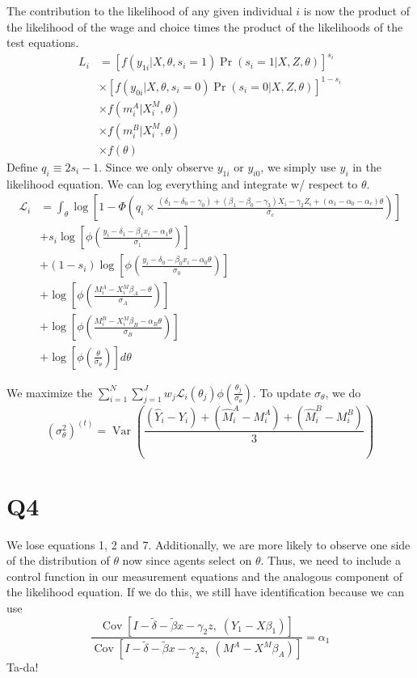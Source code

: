 \documentclass[11pt,letterpaper]{article}
\DeclareMathOperator{\Var}{Var}
\DeclareMathOperator{\Cov}{Cov}
\begin{document}
The contribution to the likelihood of any given individual $i$ is now the product of the likelihood of the wage and choice times the product of the likelihoods of the test equations.
\begin{align*}
L_i &= 
	         \left[f(y_{1i}|X,\theta,s_i=1)\Pr(s_i=1|X,Z,\theta)\right]^{s_i} \\
	& \times \left[f(y_{0i}|X,\theta,s_i=0)\Pr(s_i=0|X,Z,\theta)\right]^{1-s_i} \\
	& \times f(m^A_i|X_i^M,\theta) \\
	& \times f(m^B_i|X_i^M,\theta) \\
	& \times f(\theta)
\end{align*}
Define $q_i \equiv 2s_i - 1$. Since we only observe $y_{1i}$ or $y_{i0}$, we simply use $y_i$ in the likelihood equation. We can log everything and integrate w/ respect to $\theta$. 
\begin{align*}
\mathcal L_i 
	&= \int_\theta \log \left[1 - \Phi\left(
		q_i \times \frac{(\delta_1 - \delta_0 - \gamma_0) + (\beta_1 - \beta_0 - \gamma_3)X_i - \gamma_2 Z_i + (\alpha_1 - \alpha_0 - \alpha_c)\theta}{\sigma_c} 
		\right) \right] \\
	&+    s_i  \log\left[\phi\left( \frac{y_i - \delta_1 - \beta_1 x_i - \alpha_1 \theta}{\sigma_1} \right) \right] \\
	&+ (1-s_i) \log\left[\phi\left( \frac{y_i - \delta_0 - \beta_0 x_i - \alpha_0 \theta}{\sigma_0} \right) \right] \\
	&+ \log\left[\phi\left(\frac{M_i^A - X^M_i\beta_A - \theta        }{\sigma_A} \right)\right] \\
	&+ \log\left[\phi\left(\frac{M_i^B - X^M_i\beta_B - \alpha_B\theta}{\sigma_B} \right)\right] \\
	&+ \log\left[\phi\left(\frac{\theta}{\sigma_\theta}\right)\right] d\theta
\end{align*}


We maximize the $\sum_{i=1}^N \sum_{j=1}^J w_j \mathcal L_i(\theta_j) \phi\left(\frac{\theta_j}{\sigma_\theta}\right)$. To update $\sigma_\theta$, we do
\[
(\sigma_\theta^2)^{(t)} =\Var\left( \frac{(\widehat Y_i - Y_i) + (\widehat M_i^A - M_i^A) + (\widehat M_i^B - M_i^B)}{3} \right)
\]

\section{Q4}

We lose equations 1, 2 and 7. Additionally, we are more likely to observe one side of the distribution of $\theta$ now since agents select on $\theta$. Thus, we need to include a control function in our measurement equations and the analogous component of the likelihood equation. If we do this, we still have identification because we can use 
\[
\frac{\Cov\left[I - \widetilde \delta - \widetilde \beta x -\gamma_2 z,\; \left(Y_1 - X\beta_1 \right)\right]}
{\Cov\left[I - \widetilde \delta - \widetilde \beta x -\gamma_2 z,\; \left(M^A - X^M\beta_A \right)\right]} = \alpha_1
\]
Ta-da!
\end{document}
